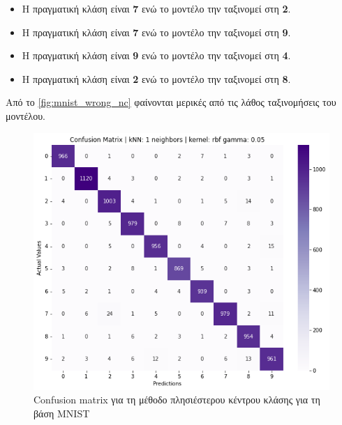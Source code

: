 \documentclass[a4paper]{article}
\begin{document}
\begin{itemize}
    \item Η πραγματική κλάση είναι {\bf7} ενώ το μοντέλο την ταξινομεί στη
        {\bf2}.
    \item Η πραγματική κλάση είναι {\bf7} ενώ το μοντέλο την ταξινομεί στη
        {\bf9}.
    \item Η πραγματική κλάση είναι {\bf9} ενώ το μοντέλο την ταξινομεί στη
        {\bf4}.
    \item Η πραγματική κλάση είναι {\bf2} ενώ το μοντέλο την ταξινομεί στη
        {\bf8}.
\end{itemize}

Από το \autoref{fig:mnist_wrong_nc} φαίνονται μερικές από τις λάθος ταξινομήσεις
του μοντέλου.

\begin{figure}[H]
    \centering
    \includegraphics[width=0.6\linewidth]{mnist/confusion_matrix_knn.png}
    \caption{Confusion matrix για τη μέθοδο πλησιέστερου κέντρου κλάσης για τη
    βάση MNIST}
    \label{fig:mnist_confusion_nc}
\end{figure}
\end{document}
